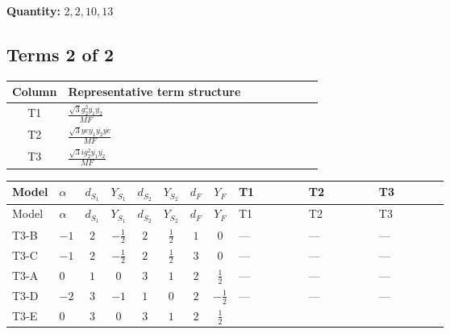 \documentclass[8pt]{article}
\begin{document}
\begin{landscape}
\begin{longtable}{@{}llcccccc >{\raggedright\arraybackslash}p{0.21\linewidth} >{\raggedright\arraybackslash}p{0.21\linewidth} >{\raggedright\arraybackslash}p{0.21\linewidth}@{}}
\midrule
\bottomrule
\end{longtable}
\clearpage
\noindent\textbf{Quantity: }$\mathrm{2,2,10,13}$\par\smallskip
\subsection*{Terms 2 of 2}
\begin{center}
\begin{tabular}{@{}c >{\raggedright\arraybackslash}p{0.82\linewidth}@{}}
\toprule
Column & Representative term structure \\
\midrule
T1 & \(\displaystyle \frac{\sqrt{3} g_{2}^{2} \overline{y_{1}} \overline{y_{2}}}{MF}\) \\
\midrule
T2 & \(\displaystyle \frac{\sqrt{3} ye \overline{y_{1}} \overline{y_{2}} \overline{ye}}{MF}\) \\
\midrule
T3 & \(\displaystyle \frac{\sqrt{3} i g_{2}^{2} \overline{y_{1}} \overline{y_{2}}}{MF}\) \\
\midrule
\bottomrule
\end{tabular}
\end{center}
\smallskip
\tiny
\begin{longtable}{@{}llcccccc >{\raggedright\arraybackslash}p{0.21\linewidth} >{\raggedright\arraybackslash}p{0.21\linewidth} >{\raggedright\arraybackslash}p{0.21\linewidth}@{}}
\toprule
Model & $\alpha$ & $d_{S_1}$ & $Y_{S_1}$ & $d_{S_2}$ & $Y_{S_2}$ & $d_F$ & $Y_F$ & T1 & T2 & T3 \\
\midrule
\endfirsthead
\toprule
Model & $\alpha$ & $d_{S_1}$ & $Y_{S_1}$ & $d_{S_2}$ & $Y_{S_2}$ & $d_F$ & $Y_F$ & T1 & T2 & T3 \\
\midrule
\endhead
T3-B & $-1$ & $2$ & $-\frac{1}{2}$ & $2$ & $\frac{1}{2}$ & $1$ & $0$ & --- & --- & --- \\
\midrule
T3-C & $-1$ & $2$ & $-\frac{1}{2}$ & $2$ & $\frac{1}{2}$ & $3$ & $0$ & --- & --- & --- \\
\midrule
T3-A & $0$ & $1$ & $0$ & $3$ & $1$ & $2$ & $\frac{1}{2}$ & --- & --- & --- \\
\midrule
T3-D & $-2$ & $3$ & $-1$ & $1$ & $0$ & $2$ & $-\frac{1}{2}$ & --- & --- & --- \\
\midrule
T3-E & $0$ & $3$ & $0$ & $3$ & $1$ & $2$ & $\frac{1}{2}$ & \scriptsize\adjustbox{max width=\linewidth}{$\begin{gathered} \frac{11 \sqrt{3} g_{2}^{2} \overline{y_{1}} \overline{y_{2}}}{8 MF}\end{gathered}$} & \scriptsize\adjustbox{max width=\linewidth}{$\begin{gathered} - \frac{\sqrt{3} ye \overline{y_{1}} \overline{y_{2}} \overline{ye}}{12 MF}\end{gathered}$} & \scriptsize\adjustbox{max width=\linewidth}{$\begin{gathered} \frac{\sqrt{3} i g_{2}^{2} \overline{y_{1}} \overline{y_{2}}}{6 MF}\end{gathered}$} \\
\midrule
\bottomrule
\end{longtable}
\clearpage

\end{landscape}
\end{document}
